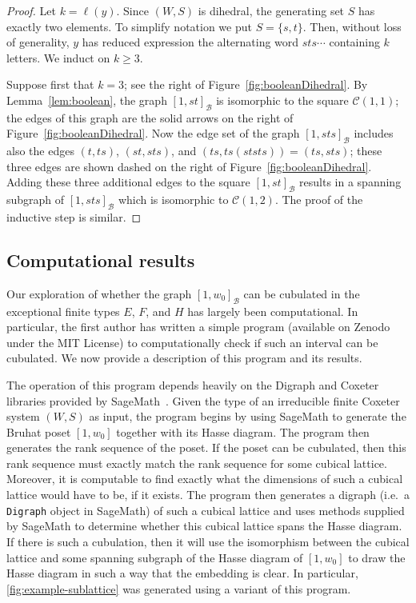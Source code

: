 \documentclass[11pt]{amsart}
\theoremstyle{plain}
\theoremstyle{definition}
\newcommand{\cC}{\mathcal{C}}
\newcommand{\cB}{\mathcal B}
\numberwithin{equation}{subsection}
\begin{document}
\begin{proof} Let $k = \ell(y)$. Since $(W,S)$ is dihedral, the generating set $S$ has exactly two elements. To simplify notation we put $S = \{ s,t\}$. Then, without loss of generality, $y$ has reduced expression the alternating word $sts \cdots$ containing $k$ letters. We induct on $k \geq 3$. 

Suppose first that $k = 3$; see the right of Figure~\ref{fig:booleanDihedral}. By Lemma~\ref{lem:boolean}, the graph $[1,st]_\cB$ is isomorphic to the square $\cC(1,1)$; the edges of this graph are the solid arrows on the right of Figure~\ref{fig:booleanDihedral}. Now the edge set of the graph $[1,sts]_\cB$ includes also the  edges $(t,ts)$, $(st,sts)$, and $(ts, ts(ststs)) = (ts, sts)$; these three edges are shown dashed on the right of Figure~\ref{fig:booleanDihedral}. Adding these three additional edges to the square $[1,st]_\cB$ results in a spanning subgraph of $[1,sts]_\cB$ which is isomorphic to $\cC(1,2)$. The proof of the inductive step is similar.
\end{proof}





\subsection{Computational results}\label{sec:computational}

Our exploration of whether the graph $[1,w_0]_\cB$ can be cubulated in the exceptional finite types $E$, $F$, and $H$  has largely been computational.
In particular, the first author has written a simple program (available on Zenodo~\cite{code} under the MIT License) to computationally check if such an interval can be cubulated.
We now provide a description of this program and its results. 

The operation of this program depends heavily on the Digraph and Coxeter libraries provided by SageMath~\cite{sage}.
Given the type of an irreducible finite Coxeter system $(W,S)$ as input, the program begins by using SageMath to generate the Bruhat poset $[1,w_0]$ together with its Hasse diagram.  The program then generates the rank sequence of the poset.  If the poset can be cubulated, then this rank sequence must exactly match the rank sequence for some cubical lattice.  Moreover, it is computable to find exactly what the dimensions of such a cubical lattice would
have to be, if it exists.  The program then generates a digraph (i.e.~a \verb!Digraph! object in SageMath) of such a cubical lattice and uses methods supplied by SageMath to determine whether this cubical lattice spans the Hasse diagram.
If there is such a cubulation, then it will use the isomorphism between the cubical lattice and some spanning subgraph of the Hasse diagram of $[1,w_0]$ to draw the Hasse diagram in such a way that the embedding is clear. 
In particular, \cref{fig:example-sublattice} was generated using a variant of this program.
\end{document}
